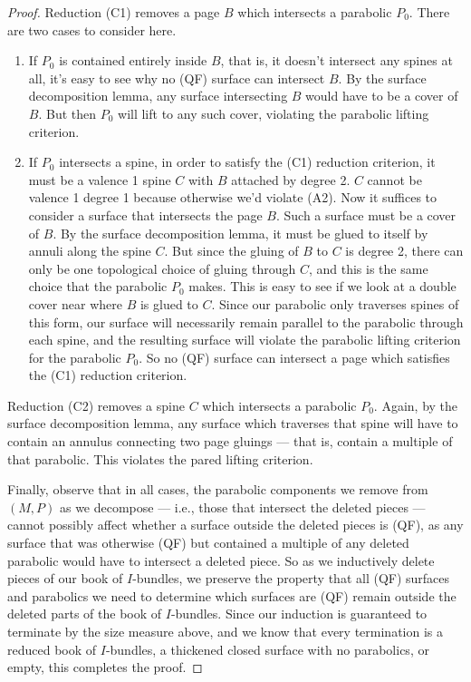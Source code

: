 \begin{proof}
Reduction (C1) removes a page $B$ which intersects a parabolic $P_0$. There are
two cases to consider here.

\begin{enumerate}

\item If $P_0$ is contained entirely inside $B$, that is, it doesn't intersect
any spines at all, it's easy to see why no (QF) surface can intersect $B$. By
the surface decomposition lemma, any surface intersecting $B$ would have to be
a cover of $B$. But then $P_0$ will lift to any such cover, violating the
parabolic lifting criterion.

\item If $P_0$ intersects a spine, in order to satisfy the (C1) reduction
criterion, it must be a valence 1 spine $C$ with $B$ attached by degree 2.  $C$
cannot be valence 1 degree 1 because otherwise we'd violate (A2). Now it
suffices to consider a surface that intersects the page $B$. Such a surface
must be a cover of $B$. By the surface decomposition lemma, it must be glued to
itself by annuli along the spine $C$. But since the gluing of $B$ to $C$ is
degree 2, there can only be one topological choice of gluing through $C$, and
this is the same choice that the parabolic $P_0$ makes. This is easy to see if
we look at a double cover near where $B$ is glued to $C$. Since our parabolic
only traverses spines of this form, our surface will necessarily remain
parallel to the parabolic through each spine, and the resulting surface will
violate the parabolic lifting criterion for the parabolic $P_0$. So no (QF)
surface can intersect a page which satisfies the (C1) reduction criterion.

\end{enumerate}

Reduction (C2) removes a spine $C$ which intersects a parabolic $P_0$. Again,
by the surface decomposition lemma, any surface which traverses that spine will
have to contain an annulus connecting two page gluings --- that is, contain
a multiple of that parabolic. This violates the pared lifting criterion.

Finally, observe that in all cases, the parabolic components we remove from
$(M,P)$ as we decompose --- i.e., those that intersect the deleted pieces ---
cannot possibly affect whether a surface outside the deleted pieces is (QF), as
any surface that was otherwise (QF) but contained a multiple of any deleted
parabolic would have to intersect a deleted piece. So as we inductively delete
pieces of our book of $I$-bundles, we preserve the property that all (QF)
surfaces and parabolics we need to determine which surfaces are (QF) remain
outside the deleted parts of the book of $I$-bundles. Since our induction is
guaranteed to terminate by the size measure above, and we know that every
termination is a reduced book of $I$-bundles, a thickened closed surface with
no parabolics, or empty, this completes the proof.

\end{proof}

